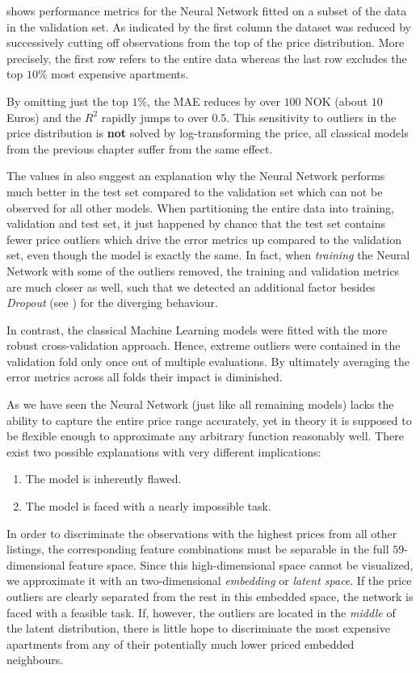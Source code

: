  shows performance metrics for the Neural Network fitted on a subset of the data in the validation set.
As indicated by the first column the dataset was reduced by successively cutting off observations from the top of the price distribution.
More precisely, the first row refers to the entire data whereas the last row excludes the top $10$\% most expensive apartments.

By omitting just the top $1$\%, the MAE reduces by over $100$ NOK (about $10$ Euros) and the $R^2$ rapidly jumps to over $0.5$.
This sensitivity to outliers in the price distribution is \textbf{not} solved by log-transforming the price, all classical models from the previous chapter suffer from the same effect.

The values in  also suggest an explanation why the Neural Network performs much better in the test set compared to the validation set which can not be observed for all other models.
When partitioning the entire data into training, validation and test set, it just happened by chance that the test set contains fewer price outliers which drive the error metrics up compared to the validation set, even though the model is exactly the same.
In fact, when \emph{training} the Neural Network with some of the outliers removed, the training and validation metrics are much closer as well, such that we detected an additional factor besides \emph{Dropout} (see ) for the diverging behaviour.

In contrast, the classical Machine Learning models were fitted with the more robust cross-validation approach.
Hence, extreme outliers were contained in the validation fold only once out of multiple evaluations.
By ultimately averaging the error metrics across all folds their impact is diminished.

As we have seen the Neural Network (just like all remaining models) lacks the ability to capture the entire price range accurately, yet in theory it is supposed to be flexible enough to approximate any arbitrary function reasonably well.
There exist two possible explanations with very different implications:
\begin{enumerate}
  \item The model is inherently flawed.
  \item The model is faced with a nearly impossible task.
\end{enumerate}
In order to discriminate the observations with the highest prices from all other listings, the corresponding feature combinations must be separable in the full $59$-dimensional feature space.
Since this high-dimensional space cannot be visualized, we approximate it with an two-dimensional \emph{embedding} or \emph{latent space}.
If the price outliers are clearly separated from the rest in this embedded space, the network is faced with a feasible task.
If, however, the outliers are located in the \emph{middle} of the latent distribution, there is little hope to discriminate the most expensive apartments from any of their potentially much lower priced embedded neighbours.

